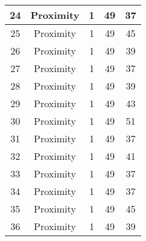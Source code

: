 \documentclass[results.tex]{subfiles}
\begin{document}
\begin{center}
\begin{tabular}{| c || c | c | c | c |}
            \hline
            24                      & Proximity                    & 1                      & 49                      & 37                   \\
            \hline
            25                      & Proximity                    & 1                      & 49                      & 45                   \\
            \hline
            26                      & Proximity                    & 1                      & 49                      & 39                   \\
            \hline
            27                      & Proximity                    & 1                      & 49                      & 37                   \\
            \hline
            28                      & Proximity                    & 1                      & 49                      & 39                   \\
            \hline
            29                      & Proximity                    & 1                      & 49                      & 43                   \\
            \hline
            30                      & Proximity                    & 1                      & 49                      & 51                   \\
            \hline
            31                      & Proximity                    & 1                      & 49                      & 37                   \\
            \hline
            32                      & Proximity                    & 1                      & 49                      & 41                   \\
            \hline
            33                      & Proximity                    & 1                      & 49                      & 37                   \\
            \hline
            34                      & Proximity                    & 1                      & 49                      & 37                   \\
            \hline
            35                      & Proximity                    & 1                      & 49                      & 45                   \\
            \hline
            36                      & Proximity                    & 1                      & 49                      & 39                   \\

\end{tabular}
\end{center}
\end{document}
